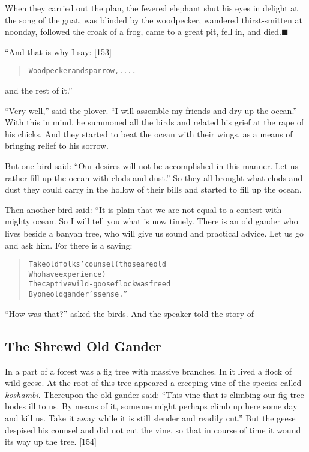 \documentclass[article, twoside, 14pt]{memoir}
\newcommand{\qed}{\hfill \ensuremath{\blacksquare}}
\renewenvironment{verbatim}{%
\begin{quote}%
\vskip -10pt%
\begin{alltt}\normalfont\large}{\end{alltt}%
\end{quote}%
\vskip -10pt
} %
\begin{document}
When they carried out the plan, the fevered elephant shut his eyes
in delight at the song of the gnat, was blinded by the woodpecker,
wandered thirst-smitten at noonday, followed the croak of a frog,
came to a great pit, fell in, and died.\hyperref[s21]{\qed}

“And that is why I say: [153]

\begin{verbatim}
Woodpecker and sparrow, . . . .
\end{verbatim}
and the rest of it.”

``Very well,'' said the plover.
``I will assemble my friends and dry up the ocean.'' With this in
mind, he summoned all the birds and related his grief at the rape
of his chicks. And they started to beat the ocean with their wings,
as a means of bringing relief to his sorrow.

But one bird said:
``Our desires will not be accomplished in this manner. Let us rather fill up the ocean with clods and dust.''
So they all brought what clods and dust they could carry in the
hollow of their bills and started to fill up the ocean.

Then another bird said: “It is plain that we are not equal to a
contest with mighty ocean. So I will tell you what is now timely.
There is an old gander who lives beside a banyan tree, who will
give us sound and practical advice. Let us go and ask him. For
there is a saying:

\begin{verbatim}
Take old folks' counsel (those are old
    Who have experience)
The captive wild-goose flock was freed
    By one old gander's sense.”
\end{verbatim}
``How was that?'' asked the birds. And the speaker told the story
of

\subsection{The Shrewd Old Gander}

\label{s22}

In a part of a forest was a fig tree with massive branches. In it
lived a flock of wild geese. At the root of this tree appeared a
creeping vine of the species called \emph{koshambi}. Thereupon the
old gander said:
``This vine that is climbing our fig tree bodes ill to us. By means of it, someone might perhaps climb up here some day and kill us. Take it away while it is still slender and readily cut.''
But the geese despised his counsel and did not cut the vine, so
that in course of time it wound its way up the tree. [154]
\end{document}
